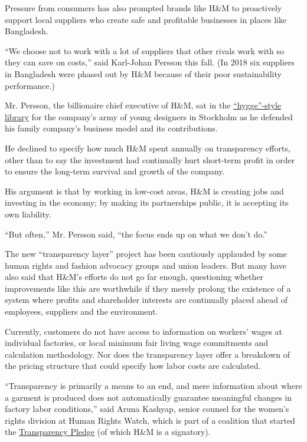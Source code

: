 Pressure from consumers has also prompted brands like H\&M to
proactively support local suppliers who create safe and profitable
businesses in places like Bangladesh.

``We choose not to work with a lot of suppliers that other rivals work
with so they can save on costs,'' said Karl-Johan Persson this fall. (In
2018 six suppliers in Bangladesh were phased out by H\&M because of
their poor sustainability performance.)

Mr. Persson, the billionaire chief executive of H\&M, sat in the
\href{https://www.nytimes3xbfgragh.onion/2016/12/24/fashion/wintering-the-danish-way-learning-about-hygge.html}{``hygge''-style
library} for the company's army of young designers in Stockholm as he
defended his family company's business model and its contributions.

He declined to specify how much H\&M spent annually on transparency
efforts, other than to say the investment had continually hurt
short-term profit in order to ensure the long-term survival and growth
of the company.

His argument is that by working in low-cost areas, H\&M is creating jobs
and investing in the economy; by making its partnerships public, it is
accepting its own liability.

``But often,'' Mr. Persson said, ``the focus ends up on what we don't
do.''

The new ``transparency layer'' project has been cautiously applauded by
some human rights and fashion advocacy groups and union leaders. But
many have also said that H\&M's efforts do not go far enough,
questioning whether improvements like this are worthwhile if they merely
prolong the existence of a system where profits and shareholder
interests are continually placed ahead of employees, suppliers and the
environment.

Currently, customers do not have access to information on workers' wages
at individual factories, or local minimum fair living wage commitments
and calculation methodology. Nor does the transparency layer offer a
breakdown of the pricing structure that could specify how labor costs
are calculated.

``Transparency is primarily a means to an end, and mere information
about where a garment is produced does not automatically guarantee
meaningful changes in factory labor conditions,'' said Aruna Kashyap,
senior counsel for the women's rights division at Human Rights Watch,
which is part of a coalition that started the
\href{https://www.hrw.org/news/2017/04/20/more-brands-should-reveal-where-their-clothes-are-made}{Transparency
Pledge} (of which H\&M is a signatory).

